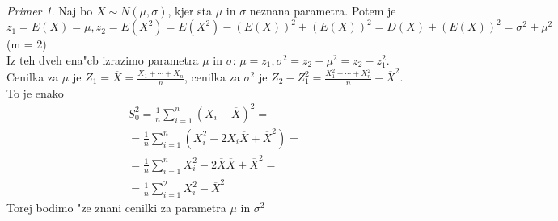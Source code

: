\documentclass[a4paper,12pt]{article}
\theoremstyle{definition}
\theoremstyle{remark}
\newtheorem*{ex}{Primer}
\begin{document}
\begin{ex}
    Naj bo $X \sim N(\mu, \sigma)$, kjer sta $\mu$ in $\sigma$ neznana parametra. Potem je $z_1 = E(X) = \mu,
    z_2 = E(X^2) = E(X^2) - (E(X))^2 + (E(X))^2 = D(X) + (E(X))^2 = \sigma^2 + \mu^2$ (m = 2) \\
    Iz teh dveh ena"cb izrazimo parametra $\mu$ in $\sigma$: $\mu = z_1, \sigma^2 = z_2 - \mu^2 = z_2 - z_1^2$. \\
    Cenilka za $\mu$ je $Z_1 = \overline{X} = \frac{X_1 + \cdots + X_n}{n}$, cenilka za $\sigma^2$ je
    $Z_2 - Z_1^2 = \frac{X_1^2 + \cdots + X_n^2}{n} - \overline{X}^2$. To je enako
    \begin{align*}
        &S_0^2 = \frac{1}{n} \sum_{i=1}^n (X_i - \overline{X})^2 = \\
        &= \frac{1}{n} \sum_{i=1}^n (X_i^2 - 2 X_i \overline{X} + \overline{X}^2) = \\
        &= \frac{1}{n} \sum_{i=1}^n X_i^2 - 2 \overline{X} \overline{X} + \overline{X}^2 = \\
        &= \frac{1}{n} \sum_{i=1}^2 X_i^2 - \overline{X}^2
    \end{align*}
    Torej bodimo "ze znani cenilki za parametra $\mu$ in $\sigma^2$
\end{ex}
\end{document}
